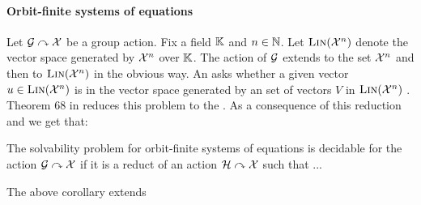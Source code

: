 \paragraph{Orbit-finite systems of equations}
%
Let $\mathcal{G}\curvearrowright\mathcal{X}$ be a group action.
Fix a field $\mathbb{K}$ and $n\in\mathbb{N}$.
Let $\textsc{Lin}(\mathcal{X}^n)$ denote the vector space generated by $\mathcal{X}^n$ over $\mathbb{K}$.
The action of $\mathcal{G}$ extends to the set $\mathcal{X}^n$ and then to $\textsc{Lin}(\mathcal{X}^n)$ in the obvious way.
An  asks whether a given vector $u\in\textsc{Lin}(\mathcal{X}^n)$ is in the vector space generated by an  set of vectors $V$ in $\textsc{Lin}(\mathcal{X}^n)$ \cite[Section 9]{GHOLAS24}.
Theorem 68 in \cite{GHOLAS24} reduces this problem to the .
As a consequence of this reduction and  we get that:
\begin{corollary}\label{cor:lin solv}
The solvability problem for orbit-finite systems of equations is decidable for the action $\mathcal{G}\curvearrowright\mathcal{X}$ if it is a reduct of an action $\mathcal{H}\curvearrowright\mathcal{X}$ such that ...
\end{corollary}
%
The above corollary extends 
%

